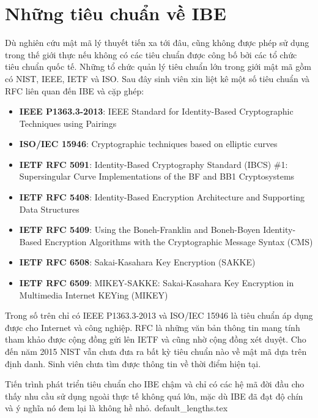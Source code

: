 \documentclass[class=report, crop=false]{standalone}
\begin{document}
	\section{Những tiêu chuẩn về IBE}
		Dù nghiên cứu mật mã lý thuyết tiến xa tới đâu, cũng không được phép sử dụng trong thế giới thực nếu không có các tiêu chuẩn được công bố bởi các tổ chức tiêu chuẩn quốc tế. Những tổ chức quản lý tiêu chuẩn lớn trong giới mật mã gồm có NIST, IEEE, IETF và ISO. Sau đây sinh viên xin liệt kê một số tiêu chuẩn và RFC liên quan đến IBE và cặp ghép:
		\vspace{-0.5\baselineskip}
		\begin{itemize}[leftmargin=1cm]
			\item \textbf{IEEE P1363.3-2013}: IEEE Standard for Identity-Based Cryptographic Techniques using Pairings
			\item \textbf{ISO/IEC 15946}: Cryptographic techniques based on elliptic curves
			\item \textbf{IETF RFC 5091}: Identity-Based Cryptography Standard (IBCS) \#1: Supersingular Curve Implementations of the BF and BB1 Cryptosystems
			\item \textbf{IETF RFC 5408}: Identity-Based Encryption Architecture and Supporting Data Structures
			\item \textbf{IETF RFC 5409}: Using the Boneh-Franklin and Boneh-Boyen Identity-Based Encryption Algorithms with the Cryptographic Message Syntax (CMS)
			\item \textbf{IETF RFC 6508}: Sakai-Kasahara Key Encryption (SAKKE)
			\item \textbf{IETF RFC 6509}: MIKEY-SAKKE: Sakai-Kasahara Key Encryption in Multimedia Internet KEYing (MIKEY)
		\end{itemize}
		Trong số trên chỉ có IEEE P1363.3-2013 và ISO/IEC 15946 là tiêu chuẩn áp dụng được cho Internet và công nghiệp. RFC là những văn bản thông tin mang tính tham khảo được cộng đồng gửi lên IETF và cũng nhờ cộng đồng xét duyệt. Cho đến năm 2015 NIST vẫn chưa đưa ra bất kỳ tiêu chuẩn nào về mật mã dựa trên định danh. Sinh viên chưa tìm được thông tin về thời điểm hiện tại.

		Tiến trình phát triển tiêu chuẩn cho IBE chậm và chỉ có các hệ mã đời đầu cho thấy nhu cầu sử dụng ngoài thực tế không quá lớn, mặc dù IBE đã đạt độ chín và ý nghĩa nó đem lại là không hề nhỏ.
	\newpage
	{default_lengths.tex}
\end{document}
